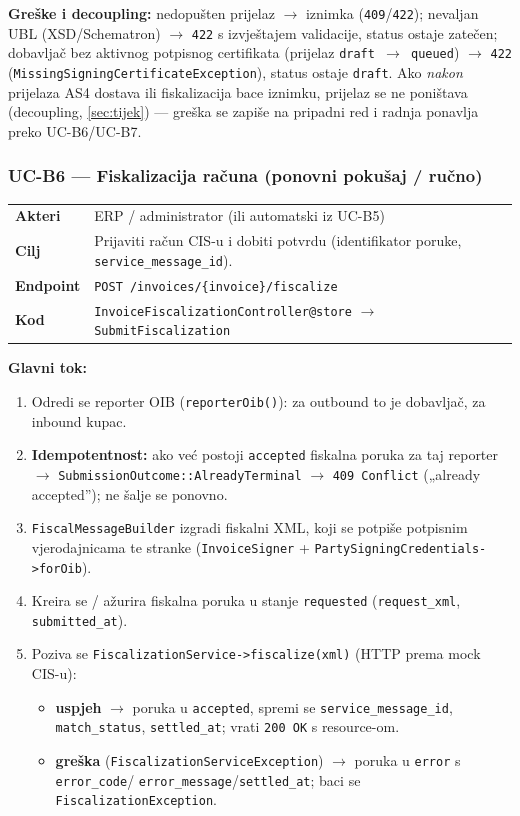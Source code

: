\documentclass[11pt,a4paper]{article}
\begin{document}
\textbf{Greške i decoupling:} nedopušten prijelaz $\rightarrow$ iznimka (\texttt{409}/\texttt{422}); nevaljan
UBL (XSD/Schematron) $\rightarrow$ \texttt{422} s izvještajem validacije, status ostaje zatečen; dobavljač bez
aktivnog potpisnog certifikata (prijelaz \texttt{draft $\rightarrow$ queued}) $\rightarrow$ \texttt{422}
(\texttt{MissingSigningCertificateException}), status ostaje \texttt{draft}. Ako
\emph{nakon} prijelaza AS4 dostava ili fiskalizacija bace iznimku, prijelaz se ne poništava
(decoupling, \ref{sec:tijek}) — greška se zapiše na pripadni red i radnja ponavlja preko UC-B6/UC-B7.

\subsubsection{UC-B6 — Fiskalizacija računa (ponovni pokušaj / ručno)}

\begin{tabularx}{\textwidth}{@{}lY@{}}
\toprule
\textbf{Akteri} & ERP / administrator (ili automatski iz UC-B5) \\
\textbf{Cilj} & Prijaviti račun CIS-u i dobiti potvrdu (identifikator poruke, \texttt{service\_message\_id}). \\
\textbf{Endpoint} & \texttt{POST /invoices/\{invoice\}/fiscalize} \\
\textbf{Kod} & \texttt{InvoiceFiscalizationController@store} $\rightarrow$ \texttt{SubmitFiscalization} \\
\bottomrule
\end{tabularx}

\textbf{Glavni tok:}
\begin{enumerate}[nosep]
  \item Odredi se reporter OIB (\texttt{reporterOib()}): za outbound to je dobavljač, za inbound kupac.
  \item \textbf{Idempotentnost:} ako već postoji \texttt{accepted} fiskalna poruka za taj reporter $\rightarrow$
        \texttt{SubmissionOutcome::AlreadyTerminal} $\rightarrow$ \texttt{409 Conflict} („already accepted”); ne šalje se ponovno.
  \item \texttt{FiscalMessageBuilder} izgradi fiskalni XML, koji se potpiše potpisnim vjerodajnicama
        te stranke (\texttt{InvoiceSigner} + \texttt{PartySigningCredentials->forOib}).
  \item Kreira se / ažurira fiskalna poruka u stanje \texttt{requested} (\texttt{request\_xml}, \texttt{submitted\_at}).
  \item Poziva se \texttt{FiscalizationService->fiscalize(xml)} (HTTP prema mock CIS-u):
    \begin{itemize}[nosep]
      \item \textbf{uspjeh} $\rightarrow$ poruka u \texttt{accepted}, spremi se \texttt{service\_message\_id}, \texttt{match\_status},
            \texttt{settled\_at}; vrati \texttt{200 OK} s resource-om.
      \item \textbf{greška} (\texttt{FiscalizationServiceException}) $\rightarrow$ poruka u \texttt{error} s \texttt{error\_code}/
            \texttt{error\_message}/\texttt{settled\_at}; baci se \texttt{FiscalizationException}.
    \end{itemize}
\end{enumerate}
\end{document}
